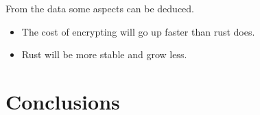 \documentclass[12pt, letterpaper]{article}
\begin{document}
\begin{multicols}{2}
    From the data some aspects can be deduced.
    \begin{itemize}
        \item The cost of encrypting will go up faster than rust does.
        \item Rust will be more stable and grow less.
    \end{itemize}

    \section{Conclusions}



\end{multicols}
\end{document}
